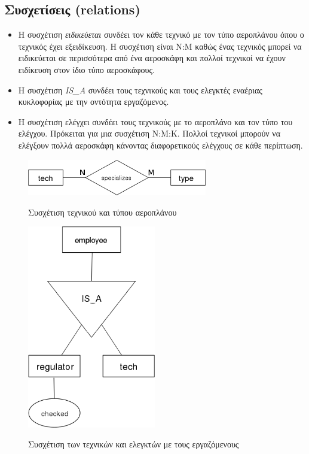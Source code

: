 \documentclass[a4paper]{article}
\begin{document}
\pagebreak
\subsection{Συσχετίσεις (relations)}
\begin{itemize}
\item Η συσχέτιση \emph{ειδικεύεται} συνδέει τον κάθε τεχνικό με τον τύπο
αεροπλάνου όπου ο τεχνικός έχει εξειδίκευση. Η συσχέτιση είναι Ν:Μ καθώς ένας
τεχνικός μπορεί να ειδικεύεται σε περισσότερα από ένα αεροσκάφη και πολλοί
τεχνικοί να έχουν ειδίκευση στον ίδιο τύπο αεροσκάφους.
\item Η συσχέτιση \emph{IS\_A} συνδέει τους τεχνικούς και τους ελεγκτές
εναέριας κυκλοφορίας με την οντότητα εργαζόμενος.
\item Η συσχέτιση ελέγχει συνδέει τους τεχνικούς με το αεροπλάνο και τον τύπο
του ελέγχου. Πρόκειται για μια συσχέτιση Ν:Μ:Κ. Πολλοί τεχνικοί μπορούν να
ελέγξουν πολλά αεροσκάφη κάνοντας διαφορετικούς ελέγχους σε κάθε περίπτωση.
\end{itemize}
\begin{figure}[h]
\centering
\includegraphics[width=0.7\textwidth]{../../ER_model/aviation_relations_1a.png}\\
\caption{Συσχέτιση τεχνικού και τύπου αεροπλάνου}
\end{figure}

\begin{figure}[h]
\centering
\includegraphics[width=0.5\textwidth]{../../ER_model/aviation_relations_1b.png}\\
\caption{Συσχέτιση των τεχνικών και ελεγκτών με τους εργαζόμενους}
\end{figure}
\end{document}
